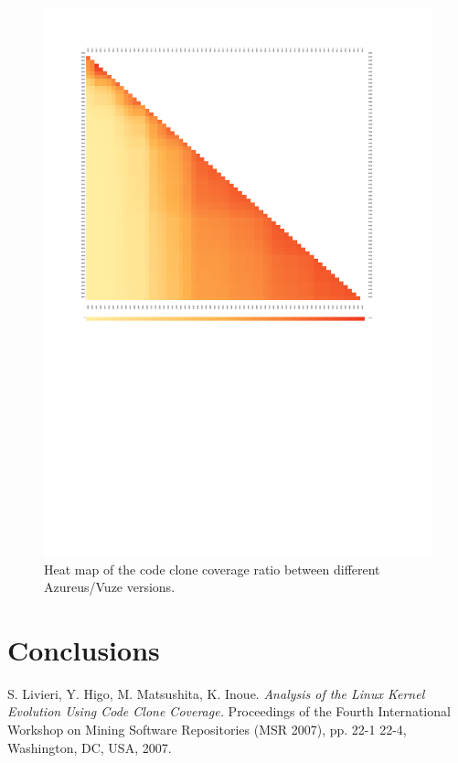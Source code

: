 \documentclass[a4paper,twoside, twocolumn, 11pt]{article}
\numberwithin{equation}{section}
\begin{document}
\begin{figure}
\center
\includegraphics[width=\textwidth]{first66min-max.pdf}
\caption{Heat map of the code clone coverage ratio between different Azureus/Vuze versions.}
\label{fig:min-max}
\end{figure}

\section{Conclusions}

\begin{thebibliography}{9}
S. Livieri, Y. Higo, M. Matsushita, K. Inoue. \emph{Analysis of the Linux Kernel Evolution Using Code Clone Coverage.} Proceedings of the Fourth International Workshop on Mining Software Repositories (MSR 2007),  pp. 22-1 22-4, Washington, DC, USA, 2007.
\end{thebibliography}
\end{document}
